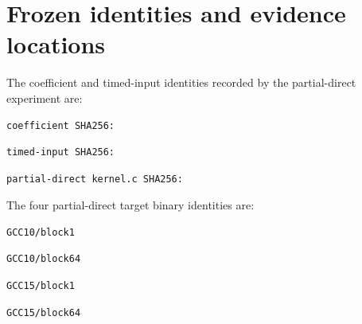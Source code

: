 \documentclass[conference]{IEEEtran}
\begin{document}
\section{Frozen identities and evidence locations}\label{appendix-b.-frozen-identities-and-evidence-locations}

The coefficient and timed-input identities recorded by the
partial-direct experiment are:

\begin{Verbatim}[breaklines,breakanywhere,breaksymbolleft={},breaksymbolright={},fontsize=\scriptsize]
coefficient SHA256:
\end{Verbatim}
\noindent\texttt{\scriptsize{}}\par
\begin{Verbatim}[breaklines,breakanywhere,breaksymbolleft={},breaksymbolright={},fontsize=\scriptsize]
timed-input SHA256:
\end{Verbatim}
\noindent\texttt{\scriptsize{}}\par
\begin{Verbatim}[breaklines,breakanywhere,breaksymbolleft={},breaksymbolright={},fontsize=\scriptsize]
partial-direct kernel.c SHA256:
\end{Verbatim}
\noindent\texttt{\scriptsize{}}\par

The four partial-direct target binary identities are:

\begin{Verbatim}[breaklines,breakanywhere,breaksymbolleft={},breaksymbolright={},fontsize=\scriptsize]
GCC10/block1
\end{Verbatim}
\noindent\texttt{\scriptsize{}}\par
\begin{Verbatim}[breaklines,breakanywhere,breaksymbolleft={},breaksymbolright={},fontsize=\scriptsize]
GCC10/block64
\end{Verbatim}
\noindent\texttt{\scriptsize{}}\par
\begin{Verbatim}[breaklines,breakanywhere,breaksymbolleft={},breaksymbolright={},fontsize=\scriptsize]
GCC15/block1
\end{Verbatim}
\noindent\texttt{\scriptsize{}}\par
\begin{Verbatim}[breaklines,breakanywhere,breaksymbolleft={},breaksymbolright={},fontsize=\scriptsize]
GCC15/block64
\end{Verbatim}
\noindent\texttt{\scriptsize{}}\par
\end{document}
